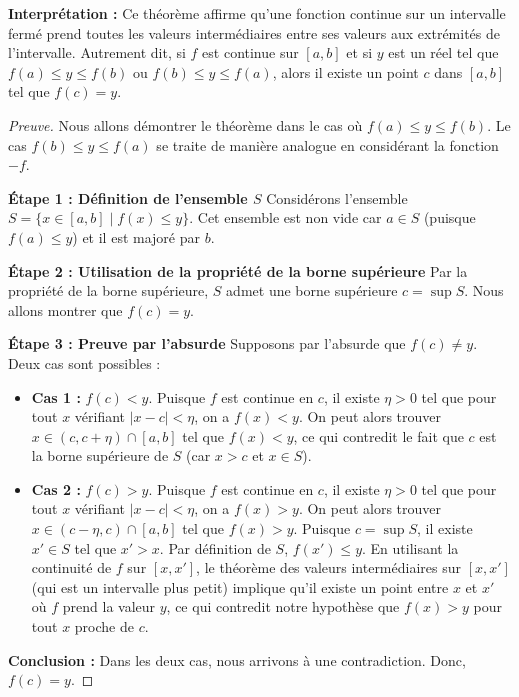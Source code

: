 \documentclass{report} %
\theoremstyle{definition}  %
\theoremstyle{plain} %
\theoremstyle{remark} %
\begin{document}
\medskip

\noindent
\textbf{Interprétation :}
Ce théorème affirme qu'une fonction continue sur un intervalle fermé prend toutes les valeurs intermédiaires entre ses valeurs aux extrémités de l'intervalle. Autrement dit, si \( f \) est continue sur \([a, b]\) et si \( y \) est un réel tel que \( f(a) \leq y \leq f(b) \) ou \( f(b) \leq y \leq f(a) \), alors il existe un point \( c \) dans \([a, b]\) tel que \( f(c) = y \).

\medskip

\begin{proof}[Preuve]
Nous allons démontrer le théorème dans le cas où \( f(a) \leq y \leq f(b) \). Le cas \( f(b) \leq y \leq f(a) \) se traite de manière analogue en considérant la fonction \(-f\).

\medskip

\noindent
\textbf{Étape 1 : Définition de l'ensemble \( S \)}
Considérons l'ensemble \( S = \{ x \in [a, b] \mid f(x) \leq y \} \). Cet ensemble est non vide car \( a \in S \) (puisque \( f(a) \leq y \)) et il est majoré par \( b \).

\medskip

\noindent
\textbf{Étape 2 : Utilisation de la propriété de la borne supérieure}
Par la propriété de la borne supérieure, \( S \) admet une borne supérieure \( c = \sup S \). Nous allons montrer que \( f(c) = y \).

\medskip

\noindent
\textbf{Étape 3 : Preuve par l'absurde}
Supposons par l'absurde que \( f(c) \neq y \). Deux cas sont possibles :

\begin{itemize}
    \item \textbf{Cas 1 :} \( f(c) < y \). Puisque \( f \) est continue en \( c \), il existe \( \eta > 0 \) tel que pour tout \( x \) vérifiant \( |x - c| < \eta \), on a \( f(x) < y \). On peut alors trouver \( x \in (c, c + \eta) \cap [a, b] \) tel que \( f(x) < y \), ce qui contredit le fait que \( c \) est la borne supérieure de \( S \) (car \( x > c \) et \( x \in S \)).

    \item \textbf{Cas 2 :} \( f(c) > y \). Puisque \( f \) est continue en \( c \), il existe \( \eta > 0 \) tel que pour tout \( x \) vérifiant \( |x - c| < \eta \), on a \( f(x) > y \). On peut alors trouver \( x \in (c - \eta, c) \cap [a, b] \) tel que \( f(x) > y \). Puisque \( c = \sup S \), il existe \( x' \in S \) tel que \( x' > x \). Par définition de \( S \), \( f(x') \leq y \). En utilisant la continuité de \( f \) sur \([x, x']\), le théorème des valeurs intermédiaires sur \([x, x']\) (qui est un intervalle plus petit) implique qu'il existe un point entre \( x \) et \( x' \) où \( f \) prend la valeur \( y \), ce qui contredit notre hypothèse que \( f(x) > y \) pour tout \( x \) proche de \( c \).
\end{itemize}

\medskip

\noindent
\textbf{Conclusion :}
Dans les deux cas, nous arrivons à une contradiction. Donc, \( f(c) = y \).
\end{proof}
\end{document}
